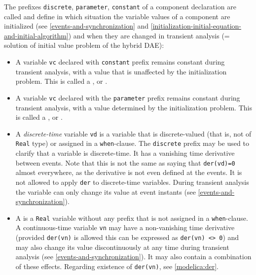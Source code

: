 The prefixes \lstinline!discrete!, \lstinline!parameter!, \lstinline!constant! of a component declaration are called  and define in which situation the variable values of a component are initialized (see \cref{events-and-synchronization} and \cref{initialization-initial-equation-and-initial-algorithm}) and when they are changed in transient analysis (= solution of initial value problem of the hybrid DAE):
\begin{itemize}
\item
  A variable \lstinline!vc! declared with \lstinline!constant! prefix remains constant during transient analysis, with a value that is unaffected by the initialization problem.
  This is called a , or .
\item
  A variable \lstinline!vc! declared with the \lstinline!parameter! prefix remains constant during transient analysis, with a value determined by the initialization problem.
  This is called a , or .
\item
  A \emph{discrete-time} variable \lstinline!vd! is a variable that is discrete-valued (that is, not of \lstinline!Real! type) or assigned in a \lstinline!when!-clause.
  The \lstinline!discrete! prefix may be used to clarify that a variable is discrete-time.
  It has a vanishing time derivative between events.
  Note that this is not the same as saying that \lstinline!der(vd)=0! almost everywhere, as the derivative is not even defined at the events.
  It is not allowed to apply \lstinline!der! to discrete-time variables.
  During transient analysis the variable can only change its value at event instants (see \cref{events-and-synchronization}).
\item
  A  is a \lstinline!Real! variable without any prefix that is not assigned in a \lstinline!when!-clause.
  A continuous-time variable \lstinline!vn! may have a non-vanishing time derivative (provided \lstinline!der(vn)! is allowed this can be expressed as \lstinline!der(vn) <> 0!) and may also change its value discontinuously at any time during transient analysis (see \cref{events-and-synchronization}).
  It may also contain a combination of these effects.
  Regarding existence of \lstinline!der(vn)!, see \cref{modelica:der}.
\end{itemize}

